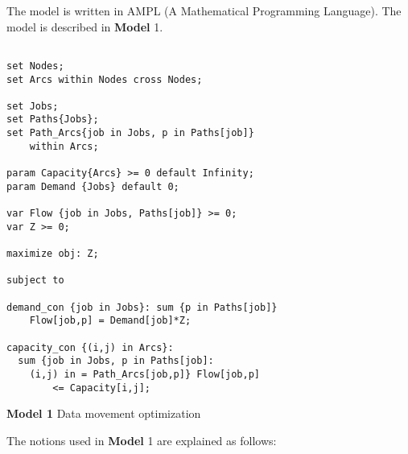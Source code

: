 
The model is written in AMPL (A Mathematical Programming Language). The model is described in \textbf{Model} 1.

\begin{algorithm}[!htbp]

\begingroup
\fontsize{9pt}{9pt}\selectfont

\begin{verbatim}

set Nodes;
set Arcs within Nodes cross Nodes;

set Jobs;
set Paths{Jobs};
set Path_Arcs{job in Jobs, p in Paths[job]} 
    within Arcs;

param Capacity{Arcs} >= 0 default Infinity;
param Demand {Jobs} default 0;

var Flow {job in Jobs, Paths[job]} >= 0;
var Z >= 0;

maximize obj: Z;

subject to

demand_con {job in Jobs}: sum {p in Paths[job]} 
	Flow[job,p] = Demand[job]*Z;

capacity_con {(i,j) in Arcs}:
  sum {job in Jobs, p in Paths[job]: 
    (i,j) in = Path_Arcs[job,p]} Flow[job,p] 
		<= Capacity[i,j];

\end{verbatim}

\endgroup

\caption*{\textbf{Model 1} Data movement optimization}
\label{mod:opt}

\end{algorithm}

The notions used in \textbf{Model} 1 are explained as follows:


